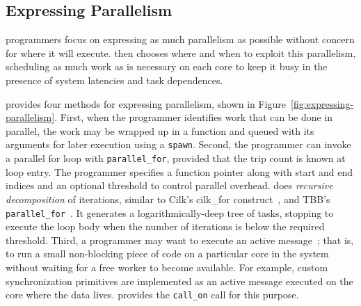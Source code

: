 \subsection{Expressing Parallelism}

\Grappa programmers focus on expressing as much parallelism as possible
without concern for where it will execute. \Grappa then chooses where and when
to exploit this parallelism, scheduling as much work as is necessary on each
core to keep it busy in the presence of system latencies and task dependences.

\Grappa provides four methods for expressing parallelism, shown in
Figure~\ref{fig:expressing-parallelism}. First, when the programmer identifies
work that can be done in parallel, the work may be wrapped up in a function
and queued with its arguments for later execution using a \texttt{spawn}.
Second,
the programmer can invoke a parallel for loop with \texttt{parallel\_for}, provided that the trip count is
known at loop entry. The programmer specifies a function pointer along with
start and end indices and an optional threshold to control parallel overhead.
\Grappa does {\em recursive decomposition} of iterations, similar to Cilk's
cilk\_for construct~\cite {cilkforimplementation}, and TBB's {\tt
parallel\_for}~\cite{intel_tbb}. It generates a logarithmically-deep tree of
tasks, stopping to execute the loop body when the number of iterations is
below the required threshold. Third, a programmer may want to execute an active message~\cite{vonEicken:1992:AMM:139669.140382}; that is, to run a
small non-blocking piece of code on a particular core in the system without waiting for
 a free worker to become available. For example, custom synchronization primitives are implemented as an active message executed on the core where the data
lives. \Grappa provides the \texttt{call\_on} call for this purpose.

